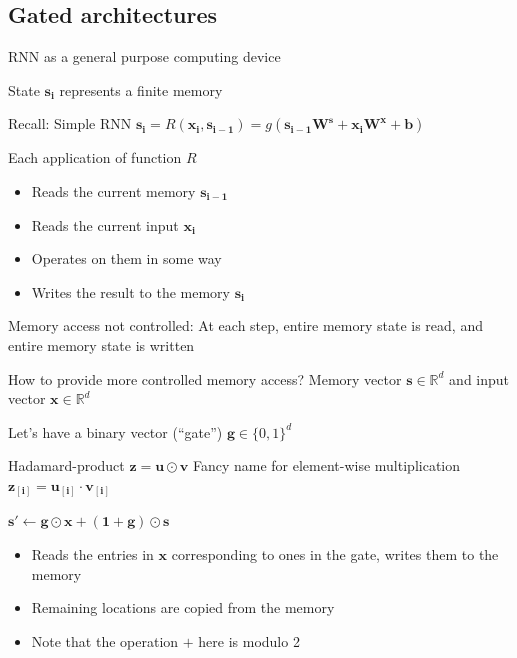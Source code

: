\documentclass[12pt,aspectratio=169,handout]{beamer}
\begin{document}
\subsection{Gated architectures}

\begin{frame}{RNN as a general purpose computing device}

State $\bm{s_i}$ represents a finite memory

\begin{block}{Recall: Simple RNN}
	$\bm{s_i} = R(\bm{x_i}, \bm{s_{i - 1}}) = g(\bm{s_{i-1}} \bm{W^s} + \bm{x_i} \bm{W^x} + \bm{b})$ 	
\end{block}
\pause
Each application of function $R$
\begin{itemize}
	\item Reads the current memory $\bm{s_{i-1}}$
	\item Reads the current input $\bm{x_i}$
	\item Operates on them in some way
	\item Writes the result to the memory $\bm{s_i}$
\end{itemize}
\pause Memory access not controlled: At each step, entire memory state is read, and entire memory state is written
\end{frame}

\begin{frame}{How to provide more controlled memory access?}
Memory vector $\bm{s} \in \mathbb{R}^d$ and input vector $\bm{x} \in \mathbb{R}^d$
\pause

Let's have a binary vector (``gate'') $\bm{g} \in \{0, 1\}^d$
\pause
\begin{block}{Hadamard-product $\bm{z} = \bm{u} \odot \bm{v}$}
	Fancy name for element-wise multiplication
	$\bm{z_{[i]}} = \bm{u_{[i]}} \cdot \bm{v_{[i]}}$
\end{block}
$
\bm{s'} \gets \bm{g} \odot \bm{x} + (\bm{1} + \bm{g}) \odot \bm{s}
$
\begin{itemize}
	\item \pause Reads the entries in $\bm{x}$ corresponding to ones in the gate, writes them to the memory
	\item \pause Remaining locations are copied from the memory
\item Note that the operation $+$ here is modulo 2
\end{itemize}

\end{frame}
\end{document}
